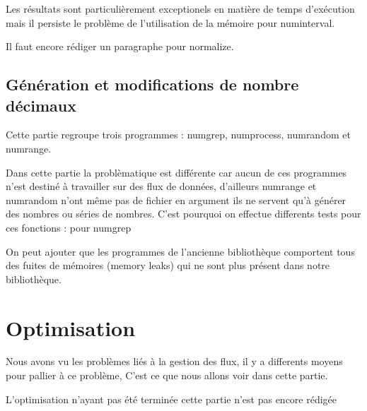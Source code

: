 Les r\'esultats sont particuli\`erement exceptionels en mati\`ere de temps d'ex\'ecution mais il persiste le probl\`eme de l'utilisation de la
 m\'emoire pour numinterval.
\newline

Il faut encore rédiger un paragraphe pour normalize.
\subsection{G\'en\'eration et modifications de nombre d\'ecimaux}

Cette partie regroupe trois programmes : numgrep, numprocess, numrandom et numrange.
\newline

Dans cette partie la probl\`ematique est différente car aucun de ces programmes n'est destin\'e \`a travailler sur des flux de donn\'ees, 
d'ailleurs numrange et numrandom n'ont m\^eme pas de fichier en argument ils ne servent qu'\`a g\'en\'erer des nombres ou s\'eries de nombres.
C'est pourquoi on effectue differents tests pour ces fonctions : pour numgrep 


On peut ajouter que les programmes de l'ancienne biblioth\`eque comportent tous des fuites de m\'emoires (memory leaks) qui ne sont plus pr\'esent 
dans notre biblioth\`eque.

\section{Optimisation}

Nous avons vu les problèmes liés à la gestion des flux, il y a differents moyens pour pallier à ce problème, 
C'est ce que nous allons voir dans cette partie.

L'optimisation n'ayant pas été terminée cette partie n'est pas encore rédigée